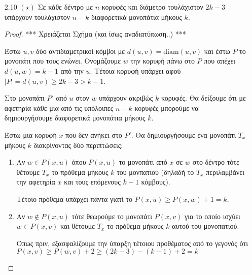 \documentclass[a4paper, oneside, 11pt]{article}
\begin{document}
\begin{enumerate}
   \item[2.10 $(\star)$]
      Σε κάθε δέντρο με $n$ κορυφές και διάμετρο τουλάχιστον
      $2k - 3$ υπάρχουν τουλάχιστον $n-k$ διαφορετικά μονοπάτια
      μήκους $k$.

      \begin{proof}

      *** Χρειάζεται Σχήμα (και ίσως αναδιατύπωση..) ***

      Έστω $u, v$ δύο αντιδιαμετρικοί κόμβοι με $d(u, v) = \text{diam}(u, v)$
      και έστω $P$ το μονοπάτι που τους ενώνει.
      Ονομάζουμε $w$ την κορυφή πάνω στο $P$ που απέχει $d(u, w) = k-1$
      από την $u$. Τέτοια κορυφή υπάρχει αφού $|P| = d(u, v) \geq 2k-3 > k-1$.


      
      Στο μονοπάτι $P'$ από $u$ στον $w$ υπάρχουν ακριβώς $k$ κορυφές.
      Θα δείξουμε ότι με αφετηρία κάθε μία από τις υπόλοιπες $n-k$ κορυφές
      μπορούμε να δημιουργήσουμε διαφορετικά μονοπάτια μήκους $k$.

      Έστω μια κορυφή $x$ που δεν ανήκει στο $P'$. Θα δημιουργήσουμε ένα
      μονοπάτι $T_x$ μήκους $k$ διακρίνοντας δύο περιπτώσεις:

      \begin{enumerate}
         \item Αν $w \in P(x, u)$ όπου $P(x, u)$ το μονοπάτι από $x$ σε
               $w$ στο δέντρο τότε θέτουμε $T_x$ το πρόθεμα μήκους $k$ του
               μονπατιού (δηλαδή το $T_x$ περιλαμβάνει την αφετηρία $x$ και
               τους επόμενους $k-1$ κόμβους).

               Τέτοιο πρόθεμα υπάρχει πάντα γιατί το $P(x, u) \geq
               P(x, w) + 1 = k$.

         \item Αν $w \notin P(x, u)$ τότε θεωρούμε το μονοπάτι $P(x, v)$
               για το οποίο ισχύει $w \in P(x, v)$ και θέτουμε $T_x$ το
               πρόθεμα μήκους $k$ αυτού του μονοπατιού.

               Όπως πριν, εξασφαλίζουμε την ύπαρξη τέτοιου προθέματος
               από το γεγονός ότι $P(x, v) \geq P(w, v) + 2 \geq
               (2k-3) - (k-1) + 2 = k$
      \end{enumerate}


\end{proof}
\end{enumerate}
\end{document}
